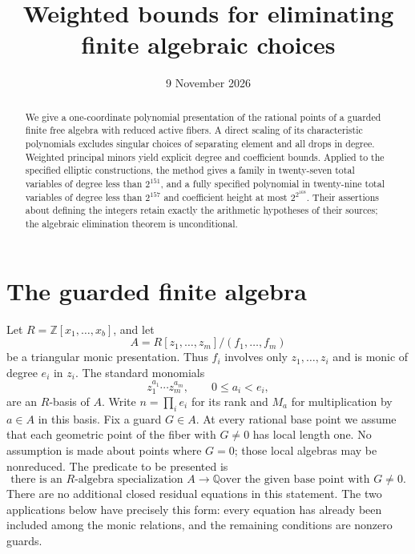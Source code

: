 \documentclass[11pt,a4paper]{article}
\title{Weighted bounds for eliminating finite algebraic choices}
\author{}\date{9 November 2026}
\newcommand{\Q}{\mathbb Q}\newcommand{\Z}{\mathbb Z}
\begin{document}
\maketitle
\begin{abstract}
We give a one-coordinate polynomial presentation of the rational points
of a guarded finite free algebra with reduced active fibers.
A direct scaling of its characteristic polynomials excludes singular
choices of separating element and all drops in degree.
Weighted principal minors yield explicit degree and coefficient bounds.
Applied to the specified elliptic constructions, the method gives a
family in twenty-seven total variables of degree less than $2^{151}$,
and a fully specified polynomial in twenty-nine total variables of
degree less than $2^{157}$ and coefficient height at most
$2^{2^{168}}$. Their assertions about defining the integers retain
exactly the arithmetic hypotheses of their sources; the algebraic
elimination theorem is unconditional.
\end{abstract}

\section{The guarded finite algebra}

Let $R=\Z[x_1,\ldots,x_b]$, and let
\[
 A=R[z_1,\ldots,z_m]/(f_1,\ldots,f_m)
\]
be a triangular monic presentation. Thus $f_i$ involves only
$z_1,\ldots,z_i$ and is monic of degree $e_i$ in $z_i$.
The standard monomials
\[
 z_1^{a_1}\cdots z_m^{a_m},\qquad 0\le a_i<e_i,
\]
are an $R$-basis of $A$. Write $n=\prod_i e_i$ for its rank
and $M_a$ for multiplication by $a\in A$ in this basis.
Fix a guard $G\in A$. At every rational base point we assume that
each geometric point of the fiber with $G\ne0$ has local length one.
No assumption is made about points where $G=0$; those local algebras
may be nonreduced. The predicate to be presented is
\begin{equation}\label{eq:predicate}
 \text{there is an $R$-algebra specialization $A\longrightarrow\Q$
 over the given base point with $G\ne0$.}
\end{equation}
There are no additional closed residual equations in this statement.
The two applications below have precisely this form: every equation
has already been included among the monic relations, and the remaining
conditions are nonzero guards.
\end{document}
